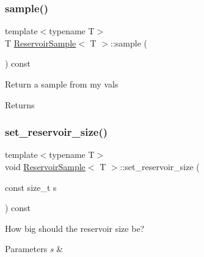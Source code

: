 \mbox{\label{class_reservoir_sample_adc52ee8c3b5cbb7fd364315614d35595}} 
\subsubsection{\texorpdfstring{sample()}{sample()}}
{\footnotesize\ttfamily template$<$typename T$>$ \\
T \hyperlink{class_reservoir_sample}{Reservoir\+Sample}$<$ T $>$\+::sample (\begin{DoxyParamCaption}{ }\end{DoxyParamCaption}) const\hspace{0.3cm}{\ttfamily [inline]}}

Return a sample from my vals \begin{DoxyReturn}{Returns}

\end{DoxyReturn}
\mbox{\label{class_reservoir_sample_ae67a44361cb145cc2f355290ff4babad}} 
\subsubsection{\texorpdfstring{set\+\_\+reservoir\+\_\+size()}{set\_reservoir\_size()}}
{\footnotesize\ttfamily template$<$typename T$>$ \\
void \hyperlink{class_reservoir_sample}{Reservoir\+Sample}$<$ T $>$\+::set\+\_\+reservoir\+\_\+size (\begin{DoxyParamCaption}\item[{const size\+\_\+t}]{s }\end{DoxyParamCaption}) const\hspace{0.3cm}{\ttfamily [inline]}}

How big should the reservoir size be? 
\begin{DoxyParams}{Parameters}
{\em s} & \\
\hline
\end{DoxyParams}
\mbox{\label{class_reservoir_sample_a53a41ec89cedfec21c7924aa98347659}} 
